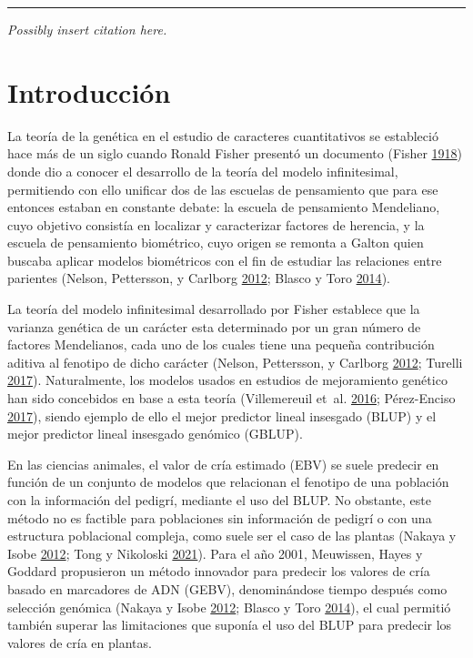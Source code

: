 \documentclass[11pt,spanish,a4paper,oneside,]{book} %
\begin{document}
\begin{center}\rule{0.5\linewidth}{0.5pt}\end{center}

\vspace*{\fill}

\noindent
\emph{Possibly insert citation here.}
\newpage

\hypertarget{intro2}{%
\section{Introducción}\label{intro2}}

La teoría de la genética en el estudio de caracteres cuantitativos se estableció hace más de un siglo cuando Ronald Fisher presentó un documento (Fisher \protect\hyperlink{ref-cite:1}{1918}) donde dio a conocer el desarrollo de la teoría del modelo infinitesimal, permitiendo con ello unificar dos de las escuelas de pensamiento que para ese entonces estaban en constante debate: la escuela de pensamiento Mendeliano, cuyo objetivo consistía en localizar y caracterizar factores de herencia, y la escuela de pensamiento biométrico, cuyo origen se remonta a Galton quien buscaba aplicar modelos biométricos con el fin de estudiar las relaciones entre parientes (Nelson, Pettersson, y Carlborg \protect\hyperlink{ref-cite:2}{2012}; Blasco y Toro \protect\hyperlink{ref-cite:3}{2014}).

La teoría del modelo infinitesimal desarrollado por Fisher establece que la varianza genética de un carácter esta determinado por un gran número de factores Mendelianos, cada uno de los cuales tiene una pequeña contribución aditiva al fenotipo de dicho carácter (Nelson, Pettersson, y Carlborg \protect\hyperlink{ref-cite:2}{2012}; Turelli \protect\hyperlink{ref-cite:9}{2017}). Naturalmente, los modelos usados en estudios de mejoramiento genético han sido concebidos en base a esta teoría (Villemereuil et~al. \protect\hyperlink{ref-cite:4}{2016}; Pérez-Enciso \protect\hyperlink{ref-cite:5}{2017}), siendo ejemplo de ello el mejor predictor lineal insesgado (BLUP) y el mejor predictor lineal insesgado genómico (GBLUP).

En las ciencias animales, el valor de cría estimado (EBV) se suele predecir en función de un conjunto de modelos que relacionan el fenotipo de una población con la información del pedigrí, mediante el uso del BLUP. No obstante, este método no es factible para poblaciones sin información de pedigrí o con una estructura poblacional compleja, como suele ser el caso de las plantas (Nakaya y Isobe \protect\hyperlink{ref-cite:6}{2012}; Tong y Nikoloski \protect\hyperlink{ref-cite:7}{2021}). Para el año 2001, Meuwissen, Hayes y Goddard propusieron un método innovador para predecir los valores de cría basado en marcadores de ADN (GEBV), denominándose tiempo después como selección genómica (Nakaya y Isobe \protect\hyperlink{ref-cite:6}{2012}; Blasco y Toro \protect\hyperlink{ref-cite:3}{2014}), el cual permitió también superar las limitaciones que suponía el uso del BLUP para predecir los valores de cría en plantas.
\end{document}
